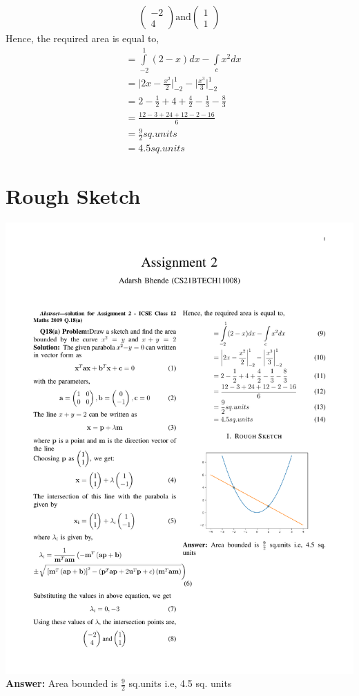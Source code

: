 \documentclass[journal,12pt,twocolumn]{IEEEtran}
\theoremstyle{remark}
\newcommand{\myvec}[1]{\ensuremath{\begin{pmatrix}#1\end{pmatrix}}}
\begin{document}
\begin{align}
    \myvec{-2 \\ 4} \text{and} \myvec{1 \\ 1}
\end{align}
Hence, the required area is equal to,
\begin{align}
&=\int\limits_{-2}^{1}(2-x)dx - \int\limits_cx^2dx\\
&=\bigg|2x-\frac{x^2}{2}\bigg|^{1}_{-2}-\bigg|\frac{x^3}{3}\bigg|^{1}_{-2}\\
&=2-\frac{1}{2}+4+\frac{4}{2}-\frac{1}{3}-\frac{8}{3}\\
&=\frac{12-3+24+12-2-16}{6}\\
&=\frac{9}{2}sq.units\\
&=4.5sq.units
\end{align}
\section{Rough Sketch}
\includegraphics[scale=.5]{main}
\textbf{Answer:}
Area bounded is $\frac{9}{2}$ sq.units i.e, 4.5 sq. units
\end{document}
